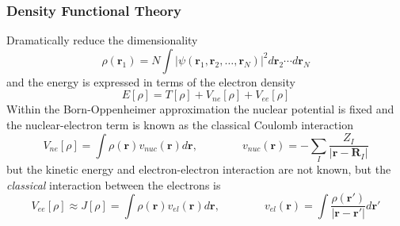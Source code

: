\documentclass[mathserif]{beamer}
\begin{document}
\begin{frame}
{\begin{center}
    \end{center}
    }
\end{frame}

\begin{frame}
    \frametitle{Density Functional Theory}
    Dramatically reduce the dimensionality 
    \begin{equation}
	\rho(\boldsymbol{r}_1) = N \int |\psi(\boldsymbol{r}_1, \boldsymbol{r}_2,\dots,
	\boldsymbol{r}_N)|^2 d\boldsymbol{r}_2\cdots d\boldsymbol{r}_N
    \end{equation}
    and the energy is expressed in terms of the electron density 
    \begin{equation}
	E[\rho] = T[\rho] + V_{ne}[\rho] + V_{ee}[\rho]
    \end{equation}
    Within the Born-Oppenheimer approximation the nuclear potential is fixed
    and the nuclear-electron term is known as the classical Coulomb interaction
    \begin{equation}
	V_{ne}[\rho] = \int \rho(\boldsymbol{r})v_{nuc}(\boldsymbol{r})d\boldsymbol{r}, 
	\qquad \qquad v_{nuc}(\boldsymbol{r})=-\sum_I\frac{Z_I}{|\boldsymbol{r}-\boldsymbol{R}_I|}
    \end{equation}
    but the kinetic energy and electron-electron interaction are not known, but
    the \emph{classical} interaction between the electrons is
    \begin{equation}
	V_{ee}[\rho] \approx J[\rho] = \int \rho(\boldsymbol{r})v_{el}(\boldsymbol{r})d\boldsymbol{r}, 
	\qquad \qquad v_{el}(\boldsymbol{r}) = 
	\int \frac{\rho(\boldsymbol{r}')}{|\boldsymbol{r}-\boldsymbol{r}'|} d\boldsymbol{r}'
    \end{equation}
\end{frame}
\end{document}
